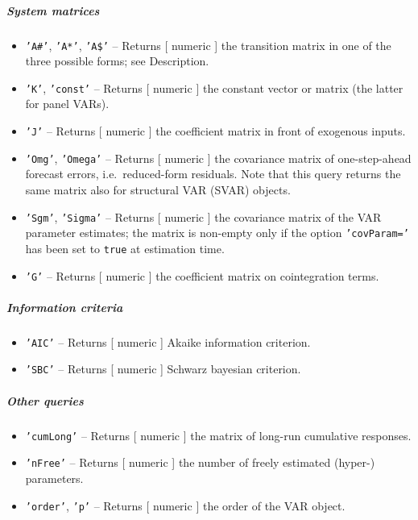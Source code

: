  \subparagraph{System matrices}
 
 \begin{itemize}
 \item
   \texttt{'A\#'}, \texttt{'A*'}, \texttt{'A\$'} -- Returns {[} numeric
   {]} the transition matrix in one of the three possible forms; see
   Description.
 \item
   \texttt{'K'}, \texttt{'const'} -- Returns {[} numeric {]} the constant
   vector or matrix (the latter for panel VARs).
 \item
   \texttt{'J'} -- Returns {[} numeric {]} the coefficient matrix in
   front of exogenous inputs.
 \item
   \texttt{'Omg'}, \texttt{'Omega'} -- Returns {[} numeric {]} the
   covariance matrix of one-step-ahead forecast errors, i.e.~reduced-form
   residuals. Note that this query returns the same matrix also for
   structural VAR (SVAR) objects.
 \item
   \texttt{'Sgm'}, \texttt{'Sigma'} -- Returns {[} numeric {]} the
   covariance matrix of the VAR parameter estimates; the matrix is
   non-empty only if the option \texttt{'covParam='} has been set to
   \texttt{true} at estimation time.
 \item
   \texttt{'G'} -- Returns {[} numeric {]} the coefficient matrix on
   cointegration terms.
 \end{itemize}
 
 \subparagraph{Information criteria}
 
 \begin{itemize}
 \item
   \texttt{'AIC'} -- Returns {[} numeric {]} Akaike information
   criterion.
 \item
   \texttt{'SBC'} -- Returns {[} numeric {]} Schwarz bayesian criterion.
 \end{itemize}
 
 \subparagraph{Other queries}
 
 \begin{itemize}
 \item
   \texttt{'cumLong'} -- Returns {[} numeric {]} the matrix of long-run
   cumulative responses.
 \item
   \texttt{'nFree'} -- Returns {[} numeric {]} the number of freely
   estimated (hyper-) parameters.
 \item
   \texttt{'order'}, \texttt{'p'} -- Returns {[} numeric {]} the order of
   the VAR object.
 \end{itemize}
 
